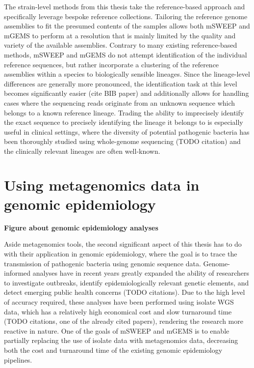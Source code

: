 \documentclass[officiallayout]{tktla}
\begin{document}
The strain-level methods from this thesis take the reference-based
approach and specifically leverage bespoke reference
collections. Tailoring the reference genome assemblies to fit the
presumed contents of the samples allows both mSWEEP and mGEMS to
perform at a resolution that is mainly limited by the quality and
variety of the available assemblies. Contrary to many existing
reference-based methods, mSWEEP and mGEMS do not attempt
identification of the individual reference sequences, but rather
incorporate a clustering of the reference assemblies within a species
to biologically sensible lineages. Since the lineage-level differences
are generally more pronounced, the identification task at this level
becomes significantly easier (cite BIB paper) and additionally allows
for handling cases where the sequencing reads originate from an
unknown sequence which belongs to a known reference lineage. Trading
the ability to imprecisely identify the exact sequence to precisely
identifying the lineage it belongs to is especially useful in clinical
settings, where the diversity of potential pathogenic bacteria has
been thoroughly studied using whole-genome sequencing (TODO citation)
and the clinically relevant lineages are often well-known.

\section{Using metagenomics data in genomic epidemiology}

\textbf{Figure about genomic epidemiology analyses}

Aside metagenomics tools, the second significant aspect of this thesis
has to do with their application in genomic epidemiology, where the
goal is to trace the transmission of pathogenic bacteria using genomic
sequence data. Genome-informed analyses have in recent years greatly
expanded the ability of researchers to investigate outbreaks, identify
epidemiologically relevant genetic elements, and detect emerging
public health concerns (TODO citations). Due to the high level of
accuracy required, these analyses have been performed using isolate
WGS data, which has a relatively high economical cost and slow
turnaround time (TODO citations, one of the already cited papers),
rendering the research more reactive in nature. One of the goals of
mSWEEP and mGEMS is to enable partially replacing the use of isolate
data with metagenomics data, decreasing both the cost and turnaround
time of the existing genomic epidemiology pipelines.
\end{document}
